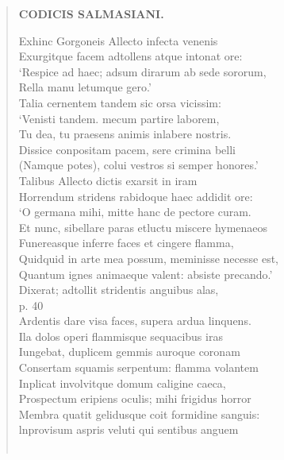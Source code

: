 \documentclass[11pt, a4paper]{report}
\begin{document}
\begin{verse}
    \begin{center} \textbf{CODICIS SALMASIANI.} \end{center}Exhinc Gorgoneis Allecto infecta venenis \\ Exurgitque facem adtollens atque intonat ore: \\ ‘Respice ad haec; adsum dirarum ab sede sororum, \\ Rella manu letumque gero.’ \\ Talia cernentem tandem sic orsa vicissim: \\ ‘Venisti tandem. mecum partire laborem, \\ Tu dea, tu praesens animis inlabere nostris. \\ Dissice conpositam pacem, sere crimina belli \\ (Namque potes), colui vestros si semper honores.’ \\ Talibus Allecto dictis exarsit in iram \\ Horrendum stridens rabidoque haec addidit ore: \\ ‘O germana mihi, mitte hanc de pectore curam. \\  \lbrack Et \rbrack  nunc, sibellare paras etluctu miscere hymenaeos \\ Funereasque inferre faces et cingere flamma, \\ Quidquid in arte mea possum, meminisse necesse est, \\ Quantum ignes animaeque valent: absiste precando.’ \\ Dixerat; adtollit stridentis anguibus alas, \\ p. 40 \\ Ardentis dare visa faces, supera ardua linquens. \\ Ila dolos operi flammisque sequacibus iras \\ Iungebat, duplicem gemmis auroque coronam \\ Consertam squamis serpentum: flamma volantem \\ Inplicat involvitque domum caligine caeca, \\ Prospectum eripiens oculis; mihi frigidus horror \\ Membra quatit gelidusque coit formidine sanguis: \\ lnprovisum aspris veluti qui sentibus anguem \\ 
        ﻿\pagebreak 

\end{verse}
\end{document}
